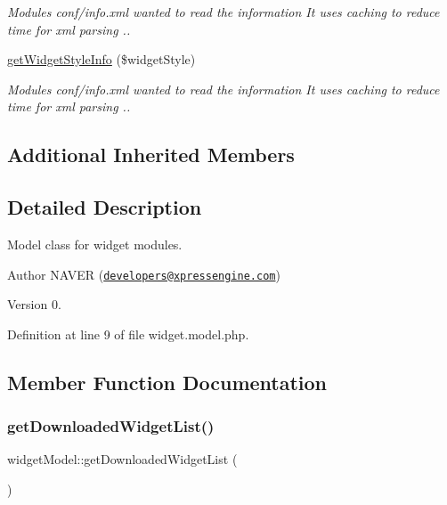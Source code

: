 \begin{DoxyCompactItemize}
\begin{DoxyCompactList}\small\item\em Modules conf/info.\+xml wanted to read the information It uses caching to reduce time for xml parsing .. \end{DoxyCompactList}\item 
\hyperlink{classwidgetModel_a185fc0ca0bcf22fd6efb045ce8912e47}{get\+Widget\+Style\+Info} (\$widget\+Style)
\begin{DoxyCompactList}\small\item\em Modules conf/info.\+xml wanted to read the information It uses caching to reduce time for xml parsing .. \end{DoxyCompactList}\end{DoxyCompactItemize}
\subsection*{Additional Inherited Members}


\subsection{Detailed Description}
Model class for widget modules. 

\begin{DoxyAuthor}{Author}
N\+A\+V\+ER (\href{mailto:developers@xpressengine.com}{\tt developers@xpressengine.\+com}) 
\end{DoxyAuthor}
\begin{DoxyVersion}{Version}
0. 
\end{DoxyVersion}


Definition at line 9 of file widget.\+model.\+php.



\subsection{Member Function Documentation}
\mbox{\label{classwidgetModel_a0035e5c87cd625a1f84d9b0a0f146e02}} 
\subsubsection{\texorpdfstring{get\+Downloaded\+Widget\+List()}{getDownloadedWidgetList()}}
{\footnotesize\ttfamily widget\+Model\+::get\+Downloaded\+Widget\+List (\begin{DoxyParamCaption}{ }\end{DoxyParamCaption})}



